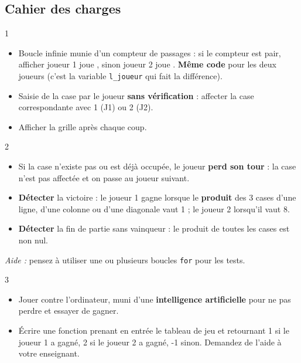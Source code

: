 \subsection*{Cahier des charges}
\begin{UPSTICahierDesCharges}{1}
\begin{itemize}
  \item Boucle infinie munie d'un compteur de passages : si le compteur est pair, afficher \og joueur 1 joue \fg{}, sinon \og joueur 2 joue \fg{}. \textbf{Même code} pour les deux joueurs (c'est la variable \texttt{l\_joueur} qui fait la différence).
  \item Saisie de la case par le joueur \textbf{sans vérification} : affecter la case correspondante avec 1 (J1) ou 2 (J2).
  \item Afficher la grille après chaque coup.
\end{itemize}
\end{UPSTICahierDesCharges}

\begin{UPSTICahierDesCharges}{2}
\begin{itemize}
  \item Si la case n'existe pas ou est déjà occupée, le joueur \textbf{perd son tour} : la case n'est pas affectée et on passe au joueur suivant.
  \item \textbf{Détecter} la victoire : le joueur 1 gagne lorsque le \textbf{produit} des 3 cases d'une ligne, d'une colonne ou d'une diagonale vaut 1 ; le joueur 2 lorsqu'il vaut 8.
  \item \textbf{Détecter} la fin de partie sans vainqueur : le produit de toutes les cases est non nul.
\end{itemize}
\textit{Aide :} pensez à utiliser une ou plusieurs boucles \texttt{for} pour les tests.
\end{UPSTICahierDesCharges}

\begin{UPSTICahierDesCharges}{3}
\begin{itemize}
  \item Jouer contre l'ordinateur, muni d'une \textbf{intelligence artificielle} pour ne pas perdre et essayer de gagner.
  \item Écrire une fonction prenant en entrée le tableau de jeu et retournant 1 si le joueur 1 a gagné, 2 si le joueur 2 a gagné, -1 sinon. Demandez de l'aide à votre enseignant.
\end{itemize}
\end{UPSTICahierDesCharges}

